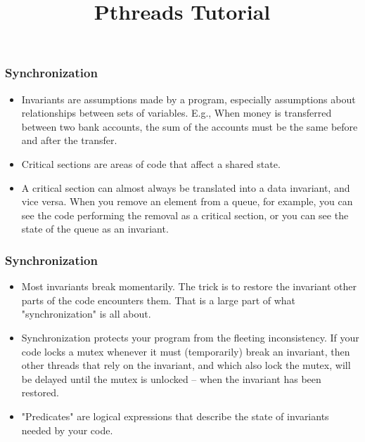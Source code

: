 \documentclass{beamer}
\title{Pthreads Tutorial}
\begin{document}
\textsf{}
\maketitle	
  
  \begin{frame}
  	\frametitle{Synchronization}
  	\begin{itemize}
      \addtolength{\itemsep}{15pt}
      \item Invariants are assumptions made by a program, especially assumptions about
            relationships between sets of variables. E.g., When money is transferred between
            two bank accounts, the sum of the accounts must be the same before and after the
            transfer.
      \item Critical sections are areas of code that affect a shared state.
      \item A critical section can almost always be translated into a data invariant, and vice
            versa. When you remove an element from a queue, for example, you can see the code
            performing the removal as a critical section, or you can see the state of the queue
            as an invariant.
  	\end{itemize}
  \end{frame}

  
  \begin{frame}
    \frametitle{Synchronization}
    \begin{itemize}
      \addtolength{\itemsep}{15pt}
      \item Most invariants break momentarily. The trick is to restore the invariant other parts
            of the code encounters them. That is a large part of what "synchronization" is all
            about.
      \item Synchronization protects your program from the fleeting inconsistency. If your code
            locks a mutex whenever it must (temporarily) break an invariant, then other threads
            that rely on the invariant, and which also lock the mutex, will be delayed until the
            mutex is unlocked -- when the invariant has been restored.
      \item "Predicates" are logical expressions that describe the state of invariants needed by
            your code.
    \end{itemize}
  \end{frame}
  
\end{document}
